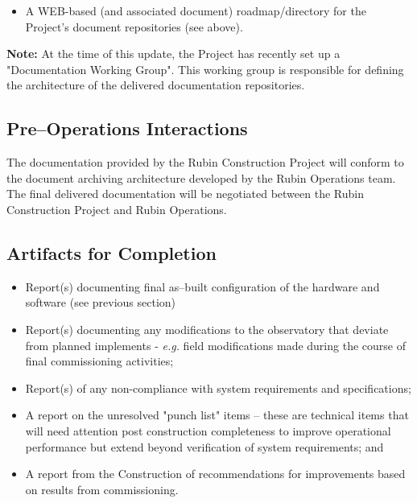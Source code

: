 \begin{itemize}
\begin{itemize}
	\item A WEB-based (and associated document) roadmap/directory for the Project's document repositories (see above).

\end{itemize}

{\bf Note:} At the time of this update, the Project has recently set up a "Documentation Working Group".  This working group is responsible for defining the architecture of the delivered documentation repositories.

\subsection{Pre--Operations Interactions}

The documentation provided by the Rubin Construction Project will conform to the document archiving architecture developed by the Rubin Operations team.  The final delivered documentation will be negotiated between the Rubin Construction Project and Rubin Operations.

\subsection{Artifacts for Completion}

\begin{itemize}

	\item Report(s) documenting final as--built configuration of the hardware and software (see previous section)
	\item Report(s) documenting any modifications to the observatory that deviate from planned implements - {\it e.g.} field modifications made during the course of final commissioning activities;
	\item Report(s) of any non-compliance with system requirements and specifications;
	\item A report on the unresolved "punch list" items -- these are technical items that will need attention post construction completeness to improve operational performance but extend beyond verification of system requirements; and
	\item A report from the Construction of recommendations for improvements based on results from commissioning.
\end{itemize}

\end{itemize}
